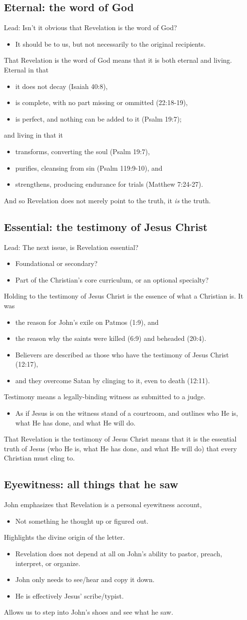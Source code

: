 \documentclass[12pt]{article}
\newcommand{\BI}{\begin{itemize}}
\newcommand{\EI}{\end{itemize}}
\newcommand{\I}{\item}
\begin{document}
\subsection{Eternal: the word of God}
\I  Lead: Isn't it obvious that Revelation is the word of God?
\BI \I It should be to us, but not necessarily to the original recipients. \EI
\I  That Revelation is the word of God means that it is both eternal and living.
    Eternal in that 
\BI \I  it does not decay (Isaiah 40:8),
    \I  is complete, with no part missing or ommitted (22:18-19),
    \I  is perfect, and nothing can be added to it (Psalm 19:7);
\EI
    and living in that it
\BI \I  transforms, converting the soul (Psalm 19:7),
    \I  purifies, cleansing from sin (Psalm 119:9-10), and
    \I  strengthens, producing endurance for trials (Matthew 7:24-27).
\EI
\I  And so Revelation does not merely point to the truth, it \emph{is} the truth.

\subsection{Essential: the testimony of Jesus Christ}
\I  Lead: The next issue, is Revelation essential?
\BI \I Foundational or secondary?
    \I Part of the Christian's core curriculum, or an optional specialty?
\EI
\I  Holding to the testimony of Jesus Christ is the essence of what a Christian is. It was 
\BI \I  the reason for John's exile on Patmos (1:9), and
    \I  the reason why the saints were killed (6:9) and beheaded (20:4).
    \I  Believers are described as those who have the testimony of Jesus Christ (12:17),
    \I  and they overcome Satan by clinging to it, even to death (12:11).
\EI
\I  Testimony means a legally-binding witness as submitted to a judge.
\BI \I  As if Jesus is on the witness stand of a courtroom, and outlines 
        who He is, what He has done, and what He will do. \EI
\I  That Revelation is the testimony of Jesus Christ means that it is the essential truth of Jesus 
    (who He is, what He has done, and what He will do)
    that every Christian must cling to.

\subsection{Eyewitness: all things that he saw}
\I  John emphasizes that Revelation is a personal eyewitness account,
\BI \I  Not something he thought up or figured out. \EI
\I  Highlights the divine origin of the letter.
\BI \I  Revelation does not depend at all on John's ability to pastor, preach, interpret, or organize.
    \I  John only needs to see/hear and copy it down.
    \I  He is effectively Jesus' scribe/typist.
\EI
\I  Allows us to step into John's shoes and see what he saw.
\end{document}
